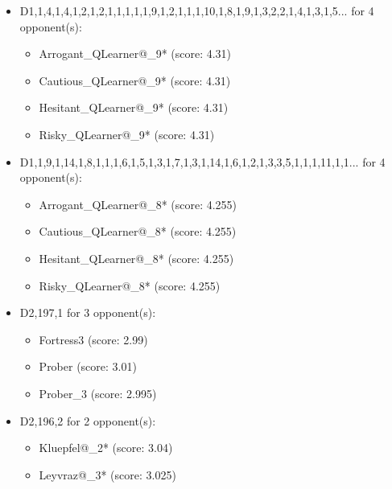 \begin{appendices}
\begin{itemize}
    \item D1,1,4,1,4,1,2,1,2,1,1,1,1,1,9,1,2,1,1,1,10,1,8,1,9,1,3,2,2,1,4,1,3,1,5... for 4 opponent(s):
    \begin{multicols}{3}
         \begin{itemize}
            \item Arrogant\_QLearner@\_9* (score: 4.31)
            \item Cautious\_QLearner@\_9* (score: 4.31)
            \item Hesitant\_QLearner@\_9* (score: 4.31)
            \item Risky\_QLearner@\_9* (score: 4.31)
        \end{itemize}
     \end{multicols}
     
    \item D1,1,9,1,14,1,8,1,1,1,6,1,5,1,3,1,7,1,3,1,14,1,6,1,2,1,3,3,5,1,1,1,11,1,1... for 4 opponent(s):
    \begin{multicols}{3}
         \begin{itemize}
            \item Arrogant\_QLearner@\_8* (score: 4.255)
            \item Cautious\_QLearner@\_8* (score: 4.255)
            \item Hesitant\_QLearner@\_8* (score: 4.255)
            \item Risky\_QLearner@\_8* (score: 4.255)
        \end{itemize}
     \end{multicols}
     
    \item D2,197,1 for 3 opponent(s):
    \begin{multicols}{3}
         \begin{itemize}
            \item Fortress3 (score: 2.99)
            \item Prober (score: 3.01)
            \item Prober\_3 (score: 2.995)
        \end{itemize}
     \end{multicols}
     
    \item D2,196,2 for 2 opponent(s):
    \begin{multicols}{3}
         \begin{itemize}
            \item Kluepfel@\_2* (score: 3.04)
            \item Leyvraz@\_3* (score: 3.025)
        \end{itemize}
     \end{multicols}
     

\end{itemize}
\end{appendices}
